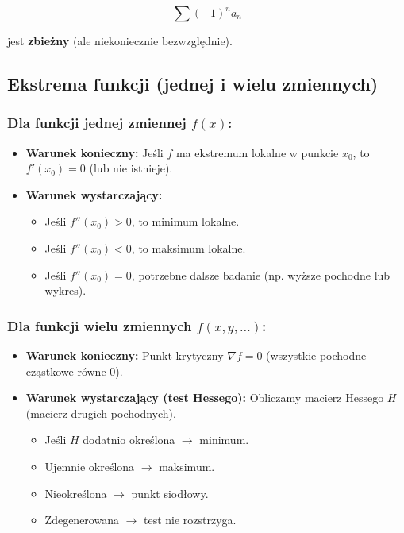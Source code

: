 $$
\sum (-1)^n a_n
$$

jest \textbf{zbieżny} (ale niekoniecznie bezwzględnie).

\subsection{Ekstrema funkcji (jednej i wielu zmiennych)}

\subsubsection*{Dla funkcji jednej zmiennej $f(x)$:}
\begin{itemize}
    \item \textbf{Warunek konieczny:} Jeśli $f$ ma ekstremum lokalne w punkcie $x_0$, to $f'(x_0) = 0$ (lub nie istnieje).
    \item \textbf{Warunek wystarczający:}
    \begin{itemize}
        \item Jeśli $f''(x_0) > 0$, to minimum lokalne.
        \item Jeśli $f''(x_0) < 0$, to maksimum lokalne.
        \item Jeśli $f''(x_0) = 0$, potrzebne dalsze badanie (np. wyższe pochodne lub wykres).
    \end{itemize}
\end{itemize}

\subsubsection*{Dla funkcji wielu zmiennych $f(x, y, \ldots)$:}
\begin{itemize}
    \item \textbf{Warunek konieczny:}
    Punkt krytyczny $\nabla f = 0$ (wszystkie pochodne cząstkowe równe 0).
    \item \textbf{Warunek wystarczający (test Hessego):}
    Obliczamy macierz Hessego $H$ (macierz drugich pochodnych).
    \begin{itemize}
        \item Jeśli $H$ dodatnio określona $\rightarrow$ minimum.
        \item Ujemnie określona $\rightarrow$ maksimum.
        \item Nieokreślona $\rightarrow$ punkt siodłowy.
        \item Zdegenerowana $\rightarrow$ test nie rozstrzyga.
    \end{itemize}
\end{itemize}

